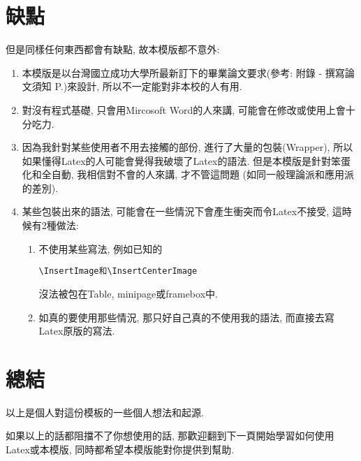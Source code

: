 
\section{缺點}
但是同樣任何東西都會有缺點, 故本模版都不意外:

\begin{enumerate}

  \item
  {
    本模版是以台灣國立成功大學所最新訂下的畢業論文要求(參考: 附錄 - 撰寫論文須知 P.\pageref{appendix:thesis-spec})來設計, 所以不一定能對非本校的人有用.
  } %

  \item
  {
    對沒有程式基礎, 只會用Mircosoft Word的人來講, 可能會在修改或使用上會十分吃力.
  } %

  \item
  {
    因為我針對某些使用者不用去接觸的部份, 進行了大量的包裝(Wrapper), 所以如果懂得Latex的人可能會覺得我破壞了Latex的語法. 但是本模版是針對笨蛋化和全自動, 我相信對不會的人來講, 才不管這問題 (如同一般理論派和應用派的差別).
  } %

  \item
  {
    某些包裝出來的語法, 可能會在一些情況下會產生衝突而令Latex不接受, 這時候有2種做法:
    \begin{enumerate}
      \item
      {
        不使用某些寫法, 例如已知的\begin{verbatim}\InsertImage和\InsertCenterImage\end{verbatim}沒法被包在Table, minipage或framebox中.
      } %

      \item
      {
        如真的要使用那些情況, 那只好自己真的不使用我的語法, 而直接去寫Latex原版的寫法.
      } %
    \end{enumerate}
  } %
\end{enumerate}


\section{總結}

以上是個人對這份模板的一些個人想法和起源.

如果以上的話都阻擋不了你想使用的話, 那歡迎翻到下一頁開始學習如何使用Latex或本模版, 同時都希望本模版能對你提供到幫助.

\EndChapter
